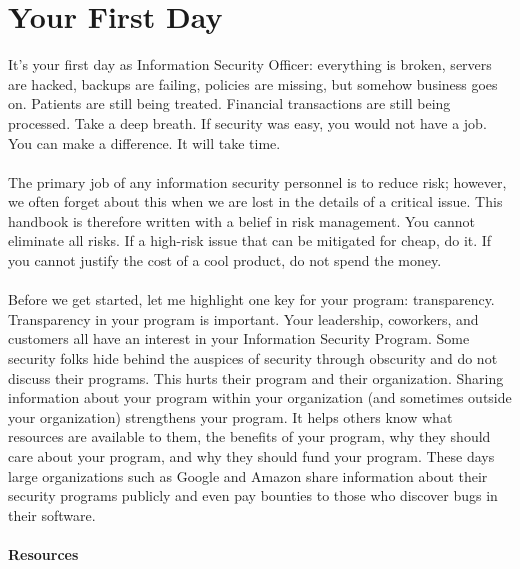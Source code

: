 \section{Your First Day}\label{sec:"Your First Day"}
It's your first day as Information Security Officer: everything is broken, servers are hacked, backups are failing, policies are missing, but somehow business goes on. Patients are still being treated. Financial transactions are still being processed. Take a deep breath. If security was easy, you would not have a job. You can make a difference. It will take time.\\\\The primary job of any information security personnel is to reduce risk; however, we often forget about this when we are lost in the details of a critical issue. This handbook is therefore written with a belief in risk management. You cannot eliminate all risks. If a high-risk issue that can be mitigated for cheap, do it. If you cannot justify the cost of a cool product, do not spend the money.\\\\
Before we get started, let me highlight one key for your program: transparency. Transparency in your program is important. Your leadership, coworkers, and customers all have an interest in your Information Security Program. Some security folks hide behind the auspices of security through obscurity and do not discuss their programs. This hurts their program and their organization. Sharing information about your program within your organization (and sometimes outside your organization) strengthens your program. It helps others know what resources are available to them, the benefits of your program, why they should care about your program, and why they should fund your program. These days large organizations such as Google and Amazon share information about their security programs publicly and even pay bounties to those who discover bugs in their software.\\\\
\textbf{Resources}
\begin{enumerate}
\end{enumerate}
